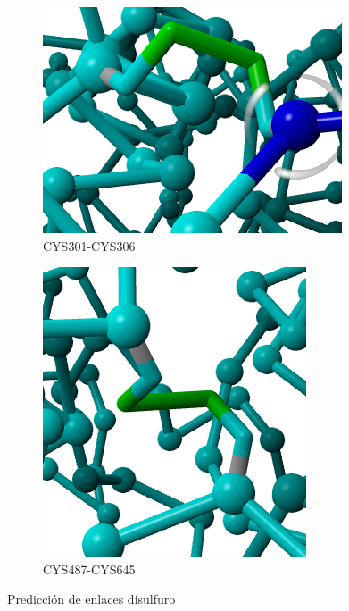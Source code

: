 \documentclass[a4paper,11pt]{report}
\begin{document}
 \begin{figure}[h!]
	\centering
	\begin{subfigure}{0.45\textwidth}
		\includegraphics[width=\linewidth]{Figuras/Figura22}
		\caption{CYS301-CYS306}
	\end{subfigure}   
	\begin{subfigure}{0.45\textwidth}
		\includegraphics[width=\linewidth]{Figuras/Figura23}
		\caption{CYS487-CYS645}
	\end{subfigure}
	
	\caption{Predicción de enlaces disulfuro}
	
\end{figure}
\end{document}
